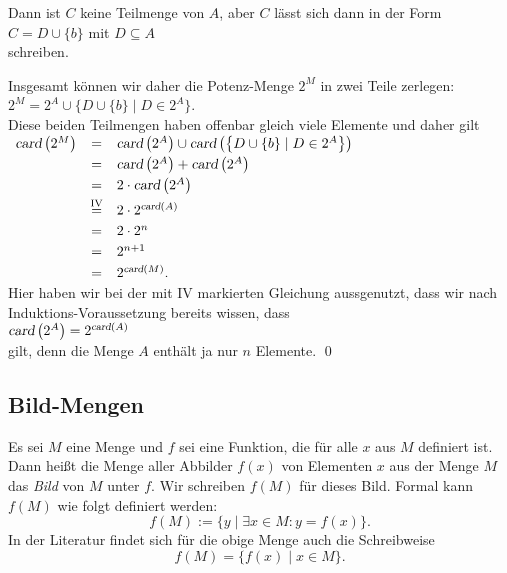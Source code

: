 \begin{enumerate}
\begin{enumerate}
           Dann ist $C$ keine Teilmenge von $A$, aber $C$ lässt sich dann in der Form 
           \\[0.2cm]
           \hspace*{1.3cm}
           $C = D \cup \{ b \}$  \quad mit $D \subseteq A$
           \\[0.2cm]
           schreiben.
     \end{enumerate}
     Insgesamt können wir daher die Potenz-Menge $2^M$ in zwei Teile zerlegen:
     \\[0.2cm]
     \hspace*{1.3cm}
     $2^M = 2^A \cup \bigl\{ D \cup \{ b \} \mid D \in 2^A \bigr\}$.
     \\[0.2cm]
     Diese beiden Teilmengen haben offenbar gleich viele Elemente und daher gilt
     \\[0.2cm]
     \hspace*{1.3cm}
     $
     \begin{array}[b]{lcl}
          \textsl{card}\left(2^M\right) & = &
          \textsl{card}\left(2^A\right) \cup \textsl{card}\left(\bigl\{ D \cup \{ b \} \mid D \in 2^A \bigr\}\right) \\[0.1cm]
     & = & \textsl{card}\left(2^A\right) + \textsl{card}\left(2^A\right) \\[0.1cm]
     & = & 2 \cdot \textsl{card}\left(2^A\right) \\[0.1cm]
     & \stackrel{\mbox{\scriptsize IV}}{=} & 2 \cdot 2^{\textsl{card}(A)} \\[0.1cm]
     & = & 2 \cdot 2^{n} \\[0.1cm]
     & = & 2^{n+1} \\[0.1cm]
     & = & 2^{\textsl{card}(M)}.  
     \end{array}
     $ 
      \\[0.2cm]
      Hier haben wir bei der mit IV markierten Gleichung aussgenutzt, dass wir nach
      Induktions-Voraussetzung bereits wissen, dass 
      \\[0.2cm]
      \hspace*{1.3cm}
      $\textsl{card}\left(2^A\right) = 2^{\textsl{card}(A)}$
      \\[0.2cm]
      gilt, denn die Menge $A$ enthält ja nur $n$ Elemente.  \qed
\end{enumerate}


\subsection{Bild-Mengen}
Es sei $M$ eine Menge und $f$ sei eine Funktion, die für alle $x$ aus $M$ definiert ist.
Dann heißt die Menge aller Abbilder $f(x)$ von Elementen $x$ aus der Menge $M$ das
\emph{Bild} von $M$ unter $f$.  Wir schreiben $f(M)$ für dieses Bild.
Formal kann $f(M)$ wie folgt definiert werden: 
 \[ f(M) := \{ y \;|\; \exists x \in M: y = f(x) \}. \]
In der Literatur findet sich für die obige Menge auch die Schreibweise
\[ f(M) = \bigl\{ f(x) \;|\; x \in M \}. \]

